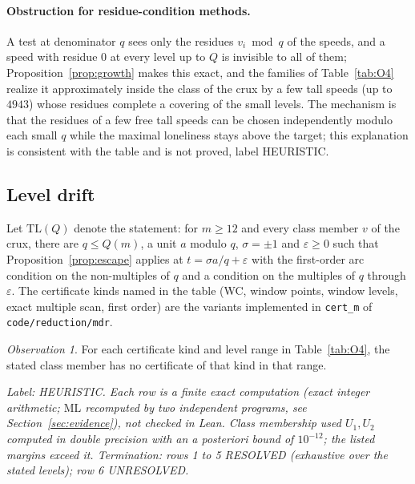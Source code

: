 \documentclass[11pt]{article}
\theoremstyle{remark}
\newtheorem{observation}[theorem]{Observation}
\newcommand{\ML}{\mathrm{ML}}
\newcommand{\lab}[1]{\par\smallskip\noindent\textit{Label: #1.}}
\begin{document}
\paragraph{Obstruction for residue-condition methods.} A test at denominator $q$ sees only the residues $v_i\bmod q$ of the speeds, and a speed with residue $0$ at every level up to $Q$ is invisible to all of them; Proposition~\ref{prop:growth} makes this exact, and the families of Table~\ref{tab:O4} realize it approximately inside the class of the crux by a few tall speeds (up to $4943$) whose residues complete a covering of the small levels. The mechanism is that the residues of a few free tall speeds can be chosen independently modulo each small $q$ while the maximal loneliness stays above the target; this explanation is consistent with the table and is not proved, label HEURISTIC.

\subsection{Level drift}\label{sec:drift}
Let $\mathrm{TL}(Q)$ denote the statement: for $m\ge12$ and every class member $v$ of the crux, there are $q\le Q(m)$, a unit $a$ modulo $q$, $\sigma=\pm1$ and $\varepsilon\ge0$ such that Proposition~\ref{prop:escape} applies at $t=\sigma a/q+\varepsilon$ with the first-order arc condition on the non-multiples of $q$ and a condition on the multiples of $q$ through $\varepsilon$. The certificate kinds named in the table (WC, window points, window levels, exact multiple scan, first order) are the variants implemented in \texttt{cert\_m} of \texttt{code/reduction/mdr}.

\begin{observation}\label{obs:O4}
For each certificate kind and level range in Table~\ref{tab:O4}, the stated class member has no certificate of that kind in that range.
\end{observation}
\lab{HEURISTIC. Each row is a finite exact computation (exact integer arithmetic; $\ML$ recomputed by two independent programs, see Section~\ref{sec:evidence}), not checked in Lean. Class membership used $U_1,U_2$ computed in double precision with an a posteriori bound of $10^{-12}$; the listed margins exceed it. Termination: rows 1 to 5 RESOLVED (exhaustive over the stated levels); row 6 UNRESOLVED}
\end{document}
